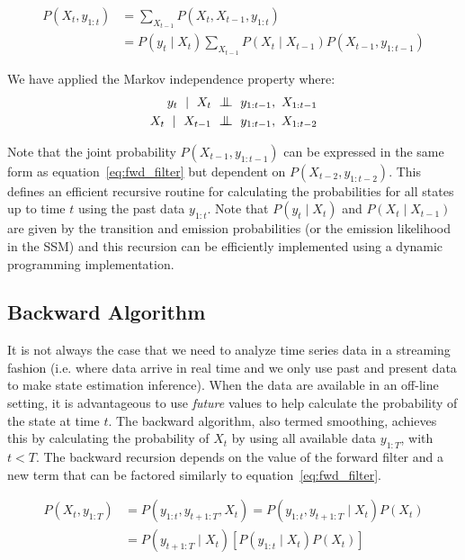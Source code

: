 \begin{equation}\label{eq:fwd_filter}
  \begin{split}
    P(X_t, y_{1:t}) &= \sum_{X_{t-1}} P(X_t, X_{t-1}, y_{1:t}) \\&= P(y_{t} \mid X_t) \sum_{X_{t-1}} P(X_t \mid X_{t-1})P(X_{t-1}, y_{1:t-1})
  \end{split}
\end{equation}

We have applied the Markov independence property where: 
\begin{equation}
	\begin{split}
	y_{t}~\mid~X_t &~\indep~y_{1:t-1},~X_{1:t-1} \\
    X_{t}~\mid~X_{t-1} &~\indep~y_{1:t-1},~X_{1:t-2}
    \end{split}
\end{equation}

Note that the joint probability $P(X_{t-1}, y_{1:t-1})$ can be expressed in the same form as equation~\ref{eq:fwd_filter} but dependent on $P(X_{t-2}, y_{1:t-2})$. This defines an efficient recursive routine for calculating the probabilities for all states up to time $t$ using the past data $y_{1:t}$. Note that $P(y_{t} \mid X_t)$ and $P(X_t \mid X_{t-1})$ are given by the transition and emission probabilities (or the emission likelihood in the SSM) and this recursion can be efficiently implemented using a dynamic programming implementation.

\subsection{Backward Algorithm}
It is not always the case that we need to analyze time series data in a streaming fashion (i.e. where data arrive in real time and we only use past and present data to make state estimation inference). When the data are available in an off-line setting, it is advantageous to use \textit{future} values to help calculate the probability of the state at time $t$. The backward algorithm, also termed smoothing, achieves this by calculating the probability of $X_t$ by using all available data $y_{1:T}$, with $t < T$. The backward recursion depends on the value of the forward filter and a new term that can be factored similarly to equation~\ref{eq:fwd_filter}.

\begin{equation}\label{eq:bkwd_filter1}
  \begin{split}
    P(X_t, y_{1:T}) &= P(y_{1:t}, y_{t+1:T}, X_t) =  P(y_{1:t}, y_{t+1:T} \mid X_t)P(X_t)\\ &= P(y_{t+1:T} \mid X_t)[P(y_{1:t} \mid X_t)P(X_t)]
  \end{split}
\end{equation}

